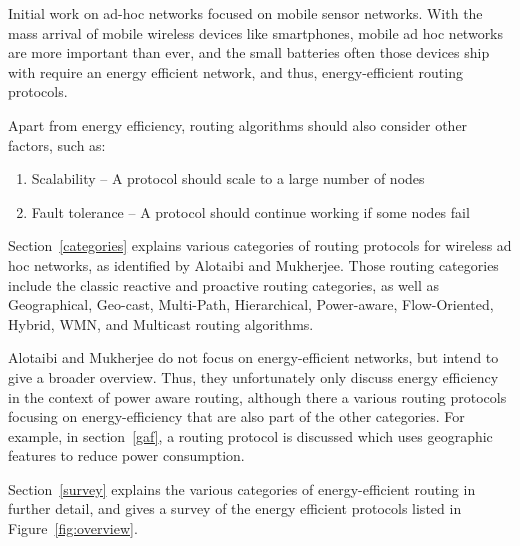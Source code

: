 Initial work on ad-hoc networks focused on mobile sensor networks. With the
mass arrival of mobile wireless devices like smartphones, mobile ad hoc networks
are more important than ever, and the small batteries often those devices ship
with require an energy efficient network, and thus, energy-efficient routing
protocols.

Apart from energy efficiency, routing algorithms should also consider other
factors, such as:
\begin{enumerate}
   \item Scalability -- A protocol should scale to a large number of nodes
   \item Fault tolerance -- A protocol should continue working if some nodes fail
\end{enumerate}

Section~\ref{categories} explains various categories of routing protocols for
wireless ad hoc networks, as identified by Alotaibi and Mukherjee\cite{alotaibi2012survey}. Those
routing categories include the classic reactive and proactive routing categories,
as well as
  Geographical, Geo-cast, Multi-Path, Hierarchical, Power-aware, Flow-Oriented,
  Hybrid, WMN, and Multicast routing algorithms. 


Alotaibi and Mukherjee\cite{alotaibi2012survey} do not focus on energy-efficient networks, but intend to give
a broader overview. Thus, they unfortunately only discuss energy efficiency in the
context of power aware routing, although there a various routing protocols
focusing on energy-efficiency that are also part of the other categories.
For example, in section~\ref{gaf}, a routing protocol is discussed which
uses geographic features to reduce power consumption.

Section~\ref{survey} explains the various categories of energy-efficient
routing in further detail, and gives a survey of the energy efficient protocols
listed in Figure~\ref{fig:overview}.

